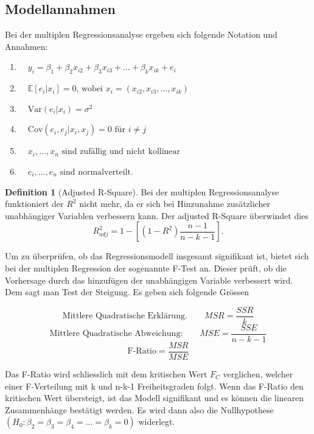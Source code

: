 \documentclass{article}
\theoremstyle{definition}
\newtheorem{definition}{Definition}
\theoremstyle{exercise}
\theoremstyle{solution}
\theoremstyle{lemma}
\begin{document}
\subsection{Modellannahmen}
Bei der multiplen Regressionsanalyse ergeben sich folgende Notation und Annahmen:

\begin{enumerate}
	\item {} \(\quad y_{i} = \beta_{1}+\beta_{2} x_{i2} + \beta_{3} x_{i3}+...+\beta_k x_{ik}+e_i \)
	\item {} \(\quad \mathbb{E}[e_i|x_i]=0 \text{, wobei } x_i=(x_{i2},x_{i3},...,x_{ik})\)
	\item {} \(\quad \text{Var}(e_i|x_i)=\sigma^2\)
	\item {} \(\quad \text{Cov}(e_i,e_j|x_i,x_j)=0 \text{ für } i \neq j\)
	\item {} \(\quad x_i,...,x_n \text{ sind zufällig und nicht kollinear}\)
	\item {} \(\quad e_i,...,e_n \text{ sind normalverteilt}.\)
\end{enumerate}

\begin{definition}[Adjusted R-Square]
Bei der multiplen Regressionsanalyse funktioniert der \(R^2\) nicht mehr, da er sich bei Hinzunahme zusätzlicher unabhängiger Variablen verbessern kann. Der adjusted R-Square überwindet dies
\[ R^2_{adj}=1-\left[(1-R^2)\frac{n-1}{n-k-1}\right].\]
\end{definition}

Um zu überprüfen, ob das Regressionsmodell insgesamt signifikant ist, bietet sich bei der multiplen Regression der sogenannte F-Test an. Dieser prüft, ob die Vorhersage durch das hinzufügen der unabhängigen Variable verbessert wird. Dem sagt man Test der Steigung. Es geben sich folgende Grössen

\[ \text{Mittlere Quadratische Erklärung.} \qquad MSR=\frac{SSR}{k}  \]
\[\text{Mittlere Quadratische Abweichung:} \qquad MSE=\frac{SSE}{n-k-1}\]
\[ \text{F-Ratio} = \frac{MSR}{MSE}\]

Das F-Ratio wird schliesslich mit dem kritischen Wert \(F_C\) verglichen, welcher einer F-Verteilung mit k und n-k-1 Freiheitsgraden folgt. Wenn das F-Ratio den kritischen Wert übersteigt, ist das Modell signifikant und es können die linearen Zusammenhänge bestätigt werden. Es wird dann also die Nullhypothese \((H_0: \beta_2=\beta_3=\beta_4=...=\beta_k=0)\) widerlegt.
\end{document}
